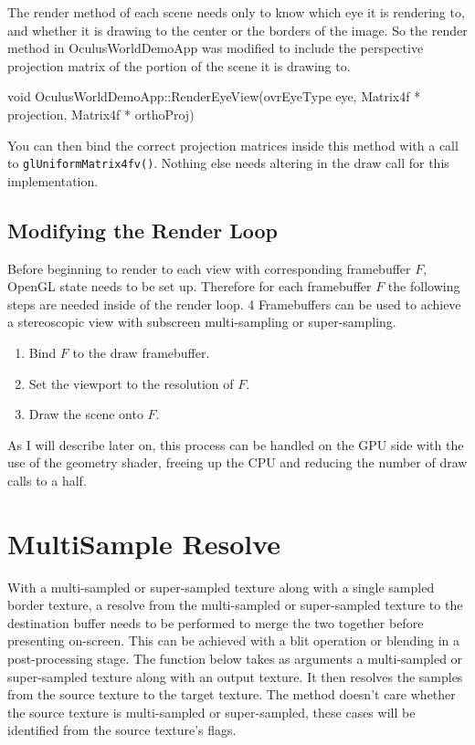 \documentclass[12pt,a4paper,twoside,openright]{report}
\begin{document}
The render method of each scene needs only to know which eye it is rendering to, and whether it is drawing to the center or the borders of the image. 
So the render method in OculusWorldDemoApp was modified to include the perspective projection matrix of the portion of the scene it is drawing to.

\begin{blockcode}[commandchars=\\\{\}]
void OculusWorldDemoApp::RenderEyeView(ovrEyeType eye,
                                       \color{green}Matrix4f * projection,
                                       \color{green}Matrix4f * orthoProj)
\end{blockcode}

\noindent You can then bind the correct projection matrices inside this method with a call to \texttt{glUniformMatrix4fv()}. Nothing else needs altering in the draw call for this implementation.

\subsection{Modifying the Render Loop}

Before beginning to render to each view with corresponding framebuffer $F$, OpenGL state needs to be set up. Therefore for each framebuffer $F$ the following steps are needed inside of the render loop. 4 Framebuffers can be used to achieve a stereoscopic view with subscreen multi-sampling or super-sampling.

\begin{enumerate}

\item Bind $F$ to the draw framebuffer.
\item Set the viewport to the resolution of $F$.
\item Draw the scene onto $F$.

\end{enumerate}

\noindent As I will describe later on, this process can be handled on the GPU side with the use of the geometry shader, freeing up the CPU and reducing the number of draw calls to a half.

\section{MultiSample Resolve}\label{resolving}

With a multi-sampled or super-sampled texture along with a single sampled border texture, a resolve from the multi-sampled or super-sampled texture to the destination buffer needs to be performed to merge the two together before presenting on-screen. This can be achieved with a blit operation or blending in a post-processing stage.
The function below takes as arguments a multi-sampled or super-sampled texture along with an output texture. It then resolves the samples from the source texture to the target texture. The method doesn't care whether the source texture is multi-sampled or super-sampled, these cases will be identified from the source texture's flags.
\end{document}
